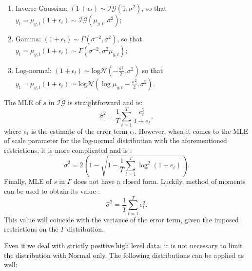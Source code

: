 \documentclass[
]{book}
\providecommand{\tightlist}{%
  \setlength{\itemsep}{0pt}\setlength{\parskip}{0pt}}
\theoremstyle{definition}
\theoremstyle{definition}
\theoremstyle{definition}
\theoremstyle{definition}
\theoremstyle{remark}
\begin{document}
\begin{enumerate}
\def\labelenumi{\arabic{enumi}.}
\tightlist
\item
  Inverse Gaussian: \(\left(1+\epsilon_t \right) \sim \mathcal{IG}(1, \sigma^2)\), so that \(y_t = \mu_{y,t} (1+\epsilon_t) \sim \mathcal{IG}(\mu_{y,t}, \sigma^2)\);
\item
  Gamma: \(\left(1+\epsilon_t \right) \sim \Gamma (\sigma^{-2}, \sigma^2)\), so that \(y_t = \mu_{y,t} (1+\epsilon_t) \sim \Gamma (\sigma^{-2}, \sigma^2 \mu_{y,t})\);
\item
  Log-normal: \(\left(1+\epsilon_t \right) \sim \mathrm{log}\mathcal{N}\left(-\frac{\sigma^2}{2}, \sigma^2\right)\) so that \(y_t = \mu_{y,t} (1+\epsilon_t) \sim \mathrm{log}\mathcal{N}(\log \mu_{y,t} -\frac{\sigma^2}{2}, \sigma^2)\).
\end{enumerate}

The MLE of \(s\) in \(\mathcal{IG}\) is straightforward and is:
\begin{equation}
    \hat{\sigma}^2 = \frac{1}{T} \sum_{t=1}^{T} \frac{e_{t}^2}{1+e_t} ,
    \label{eq:ETSMultiplicativeErrorMLESigmaIG}
\end{equation}
where \(e_t\) is the estimate of the error term \(\epsilon_t\). However, when it comes to the MLE of scale parameter for the log-normal distribution with the aforementioned restrictions, it is more complicated and is \citep{Svetunkov2020ETS}:
\begin{equation}
    \hat{\sigma}^2 = 2\left(1-\sqrt{ 1-\frac{1}{T} \sum_{t=1}^{T} \log^2(1+e_{t})}\right).
    \label{eq:ETSMultiplicativeErrorMLESigmaLogN}
\end{equation}
Finally, MLE of \(s\) in \(\mathcal{\Gamma}\) does not have a closed form. Luckily, method of moments can be used to obtain its value \citep{Svetunkov2020ETS}:
\begin{equation}
    \hat{\sigma}^2 = \frac{1}{T} \sum_{t=1}^{T} e_{t}^2 .
    \label{eq:ETSMultiplicativeErrorMLESigmaGamma}
\end{equation}
This value will coincide with the variance of the error term, given the imposed restrictions on the \(\Gamma\) distribution.

Even if we deal with strictly positive high level data, it is not necessary to limit the distribution with Normal only. The following distributions can be applied as well:
\end{document}
